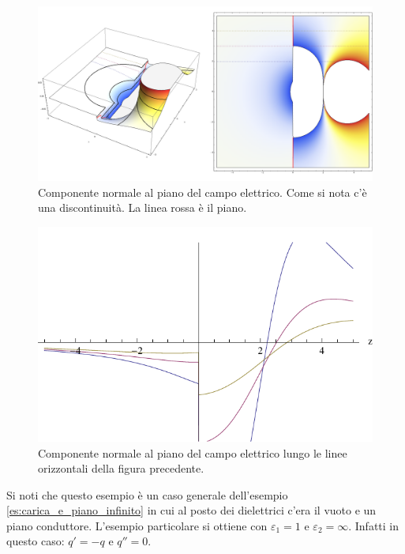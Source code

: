 \begin{Es}
  \begin{figure}[htbp]
    \centering
    \includegraphics[scale=0.2]{immagini/fisica2/campo_due_dielettrici3}
    \caption{Componente normale al piano del campo elettrico. Come si nota c'è una discontinuità. La linea rossa è il piano.}
    \label{fig:campo_piano_dielettrico3}
  \end{figure}

  \begin{figure}[htbp]
    \centering
    \includegraphics{immagini/fisica2/campo_due_dielettrici5}
    \caption{Componente normale al piano del campo elettrico lungo le linee orizzontali della figura precedente.}
    \label{fig:campo_piano_dielettrico5}
  \end{figure}

  Si noti che questo esempio è un caso generale dell'esempio \ref{es:carica_e_piano_infinito} in cui al posto dei dielettrici c'era il vuoto e un piano conduttore. L'esempio particolare si ottiene con $\varepsilon_1=1$ e $\varepsilon_2=\infty$. Infatti in questo caso: $q'=-q$ e $q''=0$.
\end{Es}


